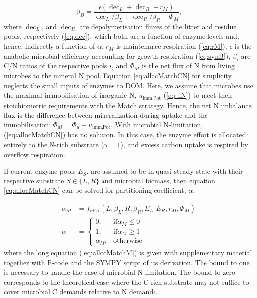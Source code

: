 \begin{equation}
\label{eq:allocMatchCN}
\beta_B = \frac{\epsilon (\operatorname{dec}_L + \operatorname{dec}_R - r_M)}{
\operatorname{dec}_L/\beta_L + \operatorname{dec}_R/\beta_R  - \Phi_M } 
\text{,}
\end{equation}
where $\operatorname{dec}_L$, and $\operatorname{dec}_R$ are depolymerisation
fluxes of the litter and residue pools, respectively (\ref{eq:dec}), which both
are a function of enzyme levels and, hence, indirectly a function of $\alpha$.
$r_M$ is maintenance respiration (\ref{eq:rM}), $\epsilon$ is the anabolic
microbial efficiency accounting for growth respiration (\ref{eq:synB}),
$\beta_i$ are C/N ratios of the respective pools $i$, and $\Phi_M$ is the net
flux of N from living microbes to the mineral N pool. Equation
\ref{eq:allocMatchCN} for simplicity neglects the small inputs of enzymes to
DOM. Here, we assume that microbes use the maximal immobilisation of inorganic
N, $u_{\operatorname{imm,Pot}}$ (\ref{eq:uN}) to meet their stoichiometric
requirements with the Match strategy.
Hence, the net N imbalance flux is the difference between mineralization during
uptake and the immobilisation:
$\Phi_M = \Phi_u - u_{\operatorname{imm,Pot}}$. With microbial N-limitation,
(\ref{eq:allocMatchCN}) has no solution. In this case, the enzyme effort is
allocated entirely to the N-rich substrate ($\alpha=1$), and excess carbon
uptake is respired by overflow respiration.

If current enzyme pools $E_S$, are assumed to be in quasi steady-state with
their respective substrate $S \in \{L,R\}$ and microbial biomass, then equation
\ref{eq:allocMatchCN} can be solved for partitioning coefficient, $\alpha$.

\begin{subequations}
\label{eq:allocMatch} 
\begin{align}
\label{eq:allocMatchM} 
\alpha_M &= f_{\operatorname{{\alpha}Fix}}(L,\beta_L,R,\beta_R, E_L, E_R, r_M,
\Phi_M)
\\
\alpha &= \begin{cases}
  0,  & \text{if} \alpha_M \le 0 \\
  1,  & \text{if} \alpha_M \ge 1 \\
  \alpha_M, & \text{otherwise}
\end{cases}   
\end{align}
\end{subequations} 
\noindent where the long equation (\ref{eq:allocMatchM}) is given with
supplementary material together with R-code and the SYMPY script of its
derivation.
The bound to one is necessary to handle the case of microbial N-limitation. The
bound to zero corresponds to the theoretical case where the C-rich substrate may
not suffice to cover microbial C demands relative to N demands.

